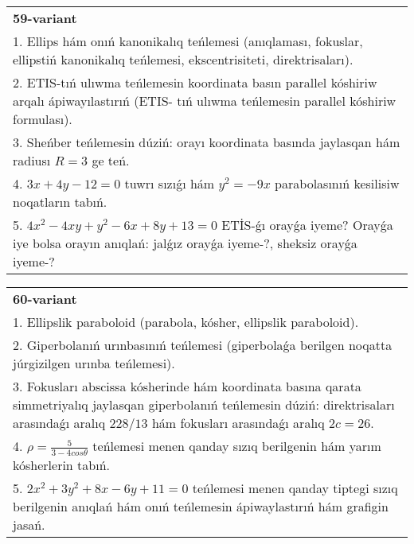 \documentclass{article}
\begin{document}
\begin{tabular}{m{17cm}}
\textbf{59-variant}\\
1. Ellips hám onıń kanonikalıq teńlemesi (anıqlaması, fokuslar, ellipstiń kanonikalıq teńlemesi, ekscentrisiteti, direktrisaları).\\

2. ETIS-tıń ulıwma teńlemesin koordinata basın parallel kóshiriw arqalı ápiwayılastırıń (ETIS- tıń ulıwma teńlemesin parallel kóshiriw formulası).\\

3. Sheńber teńlemesin dúziń: orayı koordinata basında jaylasqan hám radiusı $R=3$ ge teń.\\

4. $3x + 4y - 12 = 0$ tuwrı sızıǵı hám $y^{2} = - 9x$ parabolasınıń kesilisiw noqatların tabıń.  \\

5. $4x^{2} - 4xy + y^{2} - 6x + 8y + 13 = 0$ ETİS-ǵı orayǵa iyeme? Orayǵa iye bolsa orayın anıqlań: jalǵız orayǵa iyeme-?, sheksiz orayǵa iyeme-?  
\end{tabular}
\vspace{1cm}


\begin{tabular}{m{17cm}}
\textbf{60-variant}\\
1. Ellipslik paraboloid (parabola, kósher, ellipslik paraboloid).\\

2. Giperbolanıń urınbasınıń teńlemesi (giperbolaǵa berilgen noqatta júrgizilgen urınba teńlemesi).\\

3. Fokusları abscissa kósherinde hám koordinata basına qarata simmetriyalıq jaylasqan giperbolanıń teńlemesin dúziń: direktrisaları arasındaǵı aralıq $228/13$ hám fokusları arasındaǵı aralıq $2 c=26$.\\

4. $\rho = \frac{5}{3 - 4cos\theta}$ teńlemesi menen qanday sızıq berilgenin hám yarım kósherlerin tabıń.  \\

5. $2x^{2} + 3y^{2} + 8x - 6y + 11 = 0$ teńlemesi menen qanday tiptegi sızıq berilgenin anıqlań hám onıń teńlemesin ápiwaylastırıń hám grafigin jasań.  
\end{tabular}
\vspace{1cm}
\end{document}

